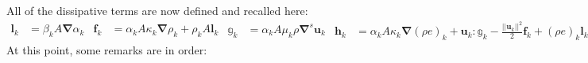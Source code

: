\documentclass[preprint,10pt]{elsarticle}
\newcommand{\grad}{\mbold{\nabla}}
\newcommand{\mbold}[1]{\boldsymbol#1}
\begin{document}
All of the dissipative terms are now defined and recalled here:
%
\begin{subequations}\label{eq:visc-reg-7-equ-sect4}
\begin{align}
  \mbold l_k &= \beta_k A \grad \alpha_k 
\end{align}
\begin{align}
  \mbold f_k &= \alpha_k A \kappa_k \grad \rho_k + \rho_k A \mbold l_k 
\end{align}
\begin{align}
\mathbb{g}_k &= \alpha_k A \mu_k \rho \grad^s \mbold u_k 
\end{align}
\begin{align}
  \mbold h_k &=  \alpha_k A \kappa_k \grad \left( \rho e \right)_k + \mbold u_k : \mathbb{g}_k - \frac{|| \mbold u_k||^2}{2} \mbold f_k + (\rho e)_k \mbold l_k 
\end{align}
\end{subequations}
%
At this point, some remarks are in order:
\end{document}

